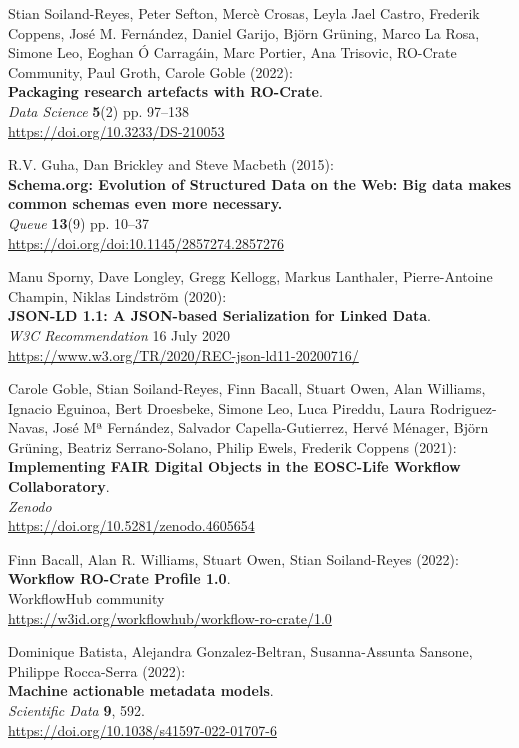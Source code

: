 \documentclass[10pt,letterpaper]{article}
\begin{document}
\begin{thebibliography}{10}
\begin{small}
Stian Soiland-Reyes, Peter Sefton, Mercè
Crosas, Leyla Jael Castro, Frederik Coppens, José M. Fernández, Daniel
Garijo, Björn Grüning, Marco La Rosa, Simone Leo, Eoghan Ó Carragáin,
Marc Portier, Ana Trisovic, RO-Crate Community, Paul Groth, Carole Goble
(2022):\\
\textbf{Packaging research artefacts with RO-Crate}.\\
\emph{Data Science} \textbf{5}(2) pp. 97--138\\
\url{https://doi.org/10.3233/DS-210053}

R.V. Guha, Dan Brickley and Steve Macbeth (2015):\\
\textbf{Schema.org: Evolution of Structured Data on the Web: Big data makes common schemas even more necessary.}\\
\emph{Queue} \textbf{13}(9) pp. 10--37\\
\url{https://doi.org/doi:10.1145/2857274.2857276}

Manu Sporny, Dave Longley, Gregg Kellogg, Markus Lanthaler, Pierre-Antoine Champin, Niklas Lindström (2020):\\
\textbf{JSON-LD 1.1: A JSON-based Serialization for Linked Data}.\\
\emph{W3C Recommendation} 16 July 2020\\
\url{https://www.w3.org/TR/2020/REC-json-ld11-20200716/}


Carole Goble, Stian Soiland-Reyes, Finn Bacall, Stuart Owen, Alan Williams, Ignacio Eguinoa, Bert Droesbeke, Simone Leo, Luca Pireddu, Laura Rodriguez-Navas, José Mª Fernández, Salvador Capella-Gutierrez, Hervé Ménager, Björn Grüning, Beatriz Serrano-Solano, Philip Ewels, Frederik Coppens (2021):\\
\textbf{Implementing FAIR Digital Objects in the EOSC-Life Workflow Collaboratory}.\\
\emph{Zenodo}\\
\url{https://doi.org/10.5281/zenodo.4605654}

Finn Bacall, Alan R. Williams, Stuart Owen, Stian Soiland-Reyes (2022):\\
\textbf{Workflow RO-Crate Profile 1.0}.\\
WorkflowHub community\\
\url{https://w3id.org/workflowhub/workflow-ro-crate/1.0}

Dominique Batista, Alejandra Gonzalez-Beltran, Susanna-Assunta Sansone, Philippe Rocca-Serra (2022):\\
\textbf{Machine actionable metadata models}.\\
\emph{Scientific Data} \textbf{9}, 592.\\
\url{https://doi.org/10.1038/s41597-022-01707-6}


\end{small}
\end{thebibliography}
\end{document}

